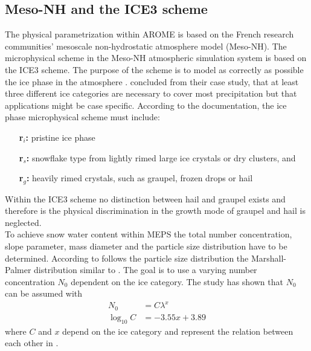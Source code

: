\subsection{Meso-NH and the ICE3 scheme} \label{sec:MesoNH}
The physical parametrization within AROME is based on the French research communities' mesoscale non-hydrostatic atmosphere model (Meso-NH). The microphysical scheme in the Meso-NH atmospheric simulation system is based on the ICE3 scheme. The purpose of the scheme is to model as correctly as possible the ice phase in the atmosphere \citep{pinty_mixed-phased_1998}. \citet{mccumber_comparison_1991} concluded from their case study, that at least three different ice categories are necessary to cover most precipitation but that applications might be case specific. 
According to the \citet{meteo_france_meso-nh_2009} documentation, the ice phase microphysical scheme must include: 
\begin{itemize}
	\item [\textbf{r$_i$:}] pristine ice phase  
	\item [\textbf{r$_s$:}] snowflake type from lightly rimed large ice crystals or dry clusters, and
	\item [\textbf{r$_g$:}] heavily rimed crystals, such as graupel, frozen drops or hail
\end{itemize}
% 
Within the ICE3 scheme no distinction between hail and graupel exists and therefore is the physical discrimination in the growth mode of graupel and hail is neglected. \\
To achieve snow water content within MEPS the total number concentration, slope parameter, mass diameter and  the particle size distribution have to be determined. 
According to \citet{caniaux_numerical_1994} follows the particle size distribution the Marshall-Palmer distribution similar to . The goal is to use a varying number concentration $N_0$ dependent on the ice category. The study has shown that $N_0$ can be assumed with
\begin{align}
	N_0 & = C \lambda^x  \label{eq:model_N0}
	\\
	\log_{10}C & = -3.55x + 3.89  \nonumber
\end{align}
where $C$ and $x$ depend on the ice category and represent the relation between each other in . 
\\
